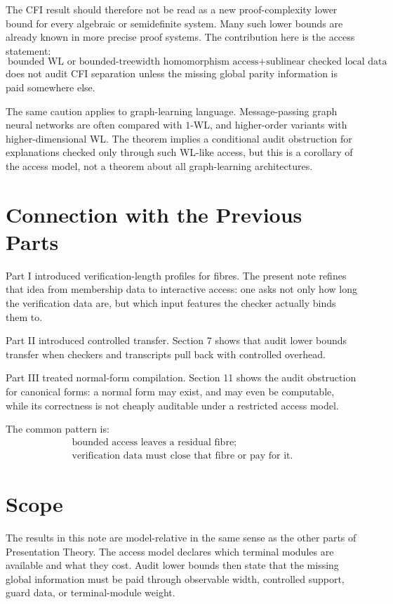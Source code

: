 \documentclass[11pt]{article}
\theoremstyle{definition}
\begin{document}
The CFI result should therefore not be read as a new proof-complexity lower bound for every algebraic or semidefinite system. Many such lower bounds are already known in more precise proof systems. The contribution here is the access statement:
\[
\text{bounded WL or bounded-treewidth homomorphism access}
+\text{sublinear checked local data}
\]
does not audit CFI separation unless the missing global parity information is paid somewhere else.

The same caution applies to graph-learning language. Message-passing graph neural networks are often compared with \(1\)-WL, and higher-order variants with higher-dimensional WL. The theorem implies a conditional audit obstruction for explanations checked only through such WL-like access, but this is a corollary of the access model, not a theorem about all graph-learning architectures.

\section{Connection with the Previous Parts}

Part I introduced verification-length profiles for fibres. The present note refines that idea from membership data to interactive access: one asks not only how long the verification data are, but which input features the checker actually binds them to.

Part II introduced controlled transfer. Section 7 shows that audit lower bounds transfer when checkers and transcripts pull back with controlled overhead.

Part III treated normal-form compilation. Section 11 shows the audit obstruction for canonical forms: a normal form may exist, and may even be computable, while its correctness is not cheaply auditable under a restricted access model.

The common pattern is:
\[
\begin{gathered}
\text{bounded access leaves a residual fibre;}\\
\text{verification data must close that fibre or pay for it.}
\end{gathered}
\]

\section{Scope}

The results in this note are model-relative in the same sense as the other parts of Presentation Theory. The access model declares which terminal modules are available and what they cost. Audit lower bounds then state that the missing global information must be paid through observable width, controlled support, guard data, or terminal-module weight.
\end{document}
